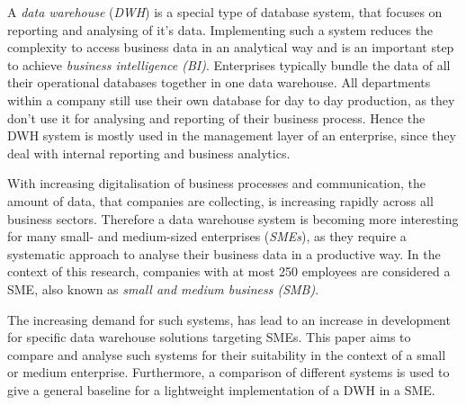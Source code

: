 \documentclass[../paper.tex]{subfiles}
\begin{document}
A \textit{data warehouse} (\textit{DWH}) is a special type of database system, that focuses on reporting and analysing of it's data. Implementing such a system reduces the complexity to access business data in an analytical way and is an important step to achieve \textit{business intelligence (BI)}. Enterprises typically bundle the data of all their operational databases together in one data warehouse. All departments within a company still use their own database for day to day production, as they don't use it for analysing and reporting of their business process. Hence the DWH system is mostly used in the management layer of an enterprise, since they deal with internal reporting and business analytics.

With increasing digitalisation of business processes and communication, the amount of data, that companies are collecting, is increasing rapidly across all business sectors. Therefore a data warehouse system is becoming more interesting for many small- and medium-sized enterprises (\textit{SMEs}), as they require a systematic approach to analyse their business data in a productive way. In the context of this research, companies with at most 250 employees are considered a SME, also known as \textit{small and medium business (SMB)}.

The increasing demand for such systems, has lead to an increase in development for specific data warehouse solutions targeting SMEs. This paper aims to compare and analyse such systems for their suitability in the context of a small or medium enterprise. Furthermore, a comparison of different systems is used to give a general baseline for a lightweight implementation of a DWH in a SME.
\end{document}
